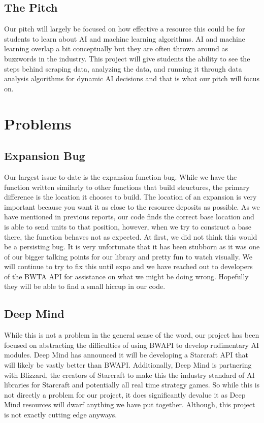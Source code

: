 \documentclass[10pt,letterpaper,onecolumn,draftclsnofoot]{IEEEtran}
\begin{document}
\subsection{The Pitch}
Our pitch will largely be focused on how effective a resource this could be for students to learn about AI and machine learning algorithms. AI and machine learning overlap a bit conceptually but they are often thrown around as buzzwords in the industry. This project will give students the ability to see the steps behind scraping data, analyzing the data, and running it through data analysis algorithms for dynamic AI decisions and that is what our pitch will focus on.

\section{Problems}
\subsection{Expansion Bug}
Our largest issue to-date is the expansion function bug. While we have the function written similarly to other functions that build structures, the primary difference is the location it chooses to build. The location of an expansion is very important because you want it as close to the resource deposits as possible. As we have mentioned in previous reports, our code finds the correct base location and is able to send units to that position, however, when we try to construct a base there, the function behaves not as expected. 
At first, we did not think this would be a persisting bug. It is very unfortunate that it has been stubborn as it was one of our bigger talking points for our library and pretty fun to watch visually. We will continue to try to fix this until expo and we have reached out to developers of the BWTA API for assistance on what we might be doing wrong. Hopefully they will be able to find a small hiccup in our code.
\subsection{Deep Mind}
While this is not a problem in the general sense of the word, our project has been focused on abstracting the difficulties of using BWAPI to develop rudimentary AI modules. Deep Mind has announced it will be developing a Starcraft API that will likely be vastly better than BWAPI. Additionally, Deep Mind is partnering with Blizzard, the creators of Starcraft to make this the industry standard of AI libraries for Starcraft and potentially all real time strategy games. So while this is not directly a problem for our project, it does significantly devalue it as Deep Mind resources will dwarf anything we have put together. Although, this project is not exactly cutting edge anyways. 
\end{document}
